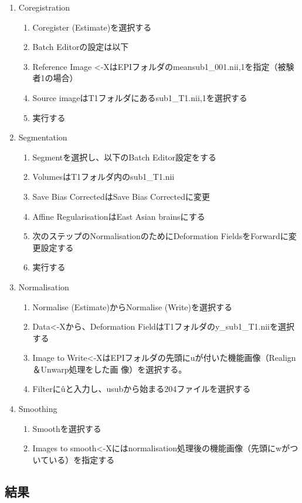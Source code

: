 \documentclass{jlreq}
\begin{document}
\begin{enumerate}
    \item Coregistration
    \begin{enumerate}
        \item Coregister (Estimate)を選択する
        \item Batch Editorの設定は以下
        \item Reference Image <-XはEPIフォルダのmeansub1\_001.nii,1を指定（被験者1の場合）
        \item Source imageはT1フォルダにあるsub1\_T1.nii,1を選択する
        \item 実行する
    \end{enumerate}
    \item Segmentation
    \begin{enumerate}
        \item Segmentを選択し、以下のBatch Editor設定をする
        \item VolumesはT1フォルダ内のsub1\_T1.nii
        \item Save Bias CorrectedはSave Bias Correctedに変更
        \item Affine RegularisationはEast Asian brainsにする
        \item 次のステップのNormalisationのためにDeformation FieldsをForwardに変更設定する
        \item 実行する
    \end{enumerate}
    \item Normalisation
    \begin{enumerate}
        \item Normalise (Estimate)からNormalise (Write)を選択する
        \item Data<-Xから、Deformation FieldはT1フォルダのy\_sub1\_T1.niiを選択する
        \item Image to Write<-XはEPIフォルダの先頭にuが付いた機能画像（Realign＆Unwarp処理をした画
        像）を選択する。
        \item Filterに\^uと入力し、usubから始まる204ファイルを選択する
        \end{enumerate}
    \item Smoothing
    \begin{enumerate}
        \item Smoothを選択する
        \item Images to smooth<-Xにはnormalisation処理後の機能画像（先頭にwがついている）を指定する 
    \end{enumerate}
\end{enumerate}
\subsection{結果}
\end{document}
